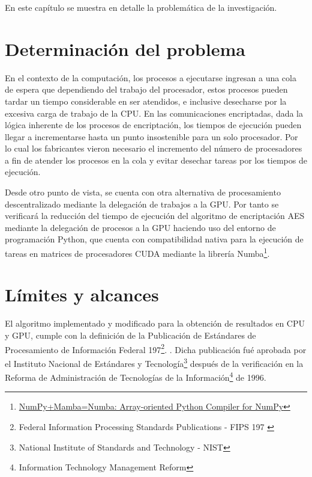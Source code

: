 \documentclass[../main/main.tex]{subfiles}
\begin{document}
\espacio

  En este capítulo se muestra en detalle la problemática de la investigación.

  \section{Determinación del problema}

  En el contexto de la computación, los procesos a ejecutarse ingresan a una cola de espera que dependiendo del trabajo del procesador, estos procesos pueden tardar un tiempo considerable en ser atendidos, e inclusive desecharse por la excesiva carga de trabajo de la CPU. En las comunicaciones encriptadas, dada la lógica inherente de los procesos de encriptación, los tiempos de ejecución pueden llegar a incrementarse hasta un punto insostenible para un solo procesador. Por lo cual los fabricantes vieron necesario el incremento del número de procesadores a fin de atender los procesos en la cola y evitar desechar tareas por los tiempos de ejecución.

  Desde otro punto de vista, se cuenta con otra alternativa de procesamiento descentralizado mediante la delegación de trabajos a la GPU. Por tanto se verificará la reducción del tiempo de ejecución del algoritmo de encriptación AES mediante la delegación de procesos a la GPU haciendo uso del entorno de programación Python, que cuenta con compatibilidad nativa para la ejecución de tareas en matrices de procesadores CUDA mediante la librería Numba\footnote{\href{http://numba.pydata.org/numba-doc/latest/cuda/index.html}{NumPy+Mamba=Numba: Array-oriented Python Compiler for NumPy}}.

  \section{Límites y alcances}

  El algoritmo implementado y modificado para la obtención de resultados en CPU y GPU, cumple con la definición de la Publicación de Estándares de Procesamiento de Información Federal 197\footnote{Federal Information Processing Standards Publications - FIPS 197 \cite{report:FIPS_197}}. \cite{report:FIPS_197}. Dicha publicación fué aprobada por el Instituto Nacional de Estándares y Tecnología\footnote{National Institute of Standards and Technology - NIST} después de la verificación en la Reforma de Administración de Tecnologías de la Información\footnote{Information Technology Management Reform} de 1996.
\end{document}
